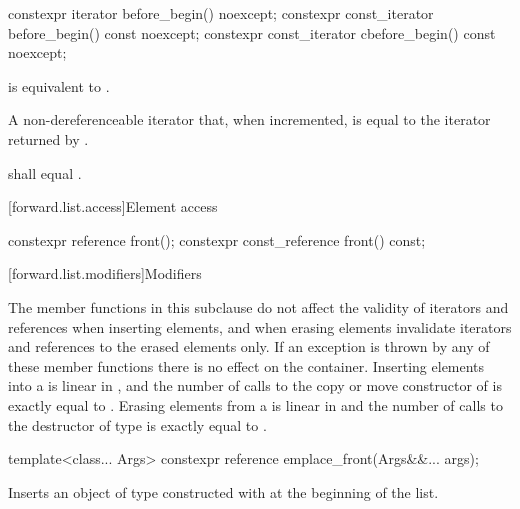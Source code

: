 %
%
\begin{itemdecl}
constexpr iterator before_begin() noexcept;
constexpr const_iterator before_begin() const noexcept;
constexpr const_iterator cbefore_begin() const noexcept;
\end{itemdecl}

\begin{itemdescr}
\pnum
\effects
{} is equivalent to
.

\pnum
\returns
A non-dereferenceable iterator that, when incremented, is equal to the iterator
returned by .

\pnum
\remarks
{} shall equal .
\end{itemdescr}

[forward.list.access]{Element access}

%
\begin{itemdecl}
constexpr reference front();
constexpr const_reference front() const;
\end{itemdecl}

\begin{itemdescr}
\pnum
\returns
{}
\end{itemdescr}

[forward.list.modifiers]{Modifiers}

\pnum
The member functions in this subclause
do not affect the validity of iterators and references
when inserting elements, and when erasing elements
invalidate iterators and references to the erased elements only.
If an exception is thrown by any of these member functions
there is no effect on the container.
Inserting  elements into a  is linear in
, and the number of calls to the copy or move constructor of  is
exactly equal to . Erasing  elements from a  is
linear in  and the number of calls to the destructor of type  is
exactly equal to .

%
\begin{itemdecl}
template<class... Args> constexpr reference emplace_front(Args&&... args);
\end{itemdecl}

\begin{itemdescr}
\pnum
\effects
Inserts an object of type  constructed with
 at the beginning of the list.
\end{itemdescr}

